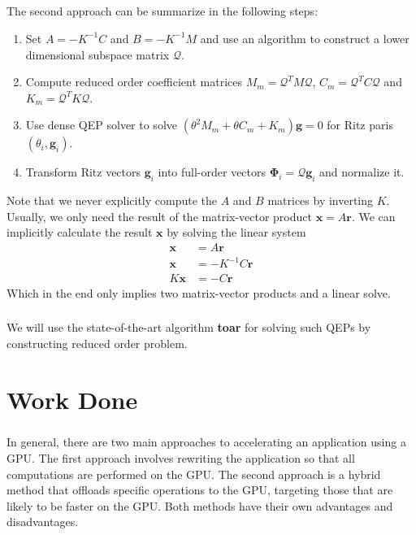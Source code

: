\paragraph*{}\label{seq:quad_eig}
The second approach can be summarize in the following steps:
\begin{enumerate}
    \item Set $A=-K^{-1}C$ and $B=-K^{-1}M$ and use an algorithm to construct a lower dimensional subspace matrix $\mathcal{Q}$.
    \item Compute reduced order coefficient matrices $M_m = \mathcal{Q}^T M \mathcal{Q}$, $C_m = \mathcal{Q}^T C \mathcal{Q}$ and $K_m =  \mathcal{Q}^T K \mathcal{Q}$.
    \item Use dense QEP solver to solve $(\theta^2M_m + \theta C_m + K_m)\mathbf{g} = 0$ for Ritz paris $(\theta_i, \mathbf{g}_i)$.
    \item Transform Ritz vectors $\mathbf{g}_i$ into full-order vectors $\boldsymbol{\Phi}_i=\mathcal{Q}\mathbf{g}_i$ and normalize it.
\end{enumerate}
Note that we never explicitly compute the $A$ and $B$ matrices by inverting $K$. Usually, we only need the result of the matrix-vector product $\mathbf{x} = A\mathbf{r}$. We can implicitly calculate the result $\mathbf{x}$ by solving the linear system
\begin{align}
    \mathbf{x} & = A\mathbf{r} \\
    \mathbf{x} & = -K^{-1}C \mathbf{r} \\
    K \mathbf{x} & = -C \mathbf{r} \label{eq:implicit_mv}
\end{align}
Which in the end only implies two matrix-vector products and a linear solve.

\paragraph*{}
We will use the state-of-the-art algorithm \textbf{\acrfull{toar}} \cite{toar2016} for solving such QEPs by constructing reduced order problem.






\newpage
\chapter{Work Done}
\paragraph*{}
In general, there are two main approaches to accelerating an application using a GPU. The first approach involves rewriting the application so that all computations are performed on the GPU. The second approach is a hybrid method that offloads specific operations to the GPU, targeting those that are likely to be faster on the GPU. Both methods have their own advantages and disadvantages.

